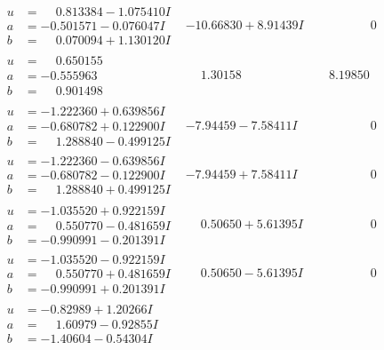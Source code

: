 \documentclass[1p]{elsarticle_modified}
\theoremstyle{definition}
\begin{document}
$$\begin{array}{c|c|c}
\begin{aligned}
u &= \phantom{-}0.813384 - 1.075410 I \\
a &= -0.501571 - 0.076047 I \\
b &= \phantom{-}0.070094 + 1.130120 I\end{aligned}
 & -10.66830 + 8.91439 I & \phantom{-0.000000 } 0 \\ \hline\begin{aligned}
u &= \phantom{-}0.650155\phantom{ +0.000000I} \\
a &= -0.555963\phantom{ +0.000000I} \\
b &= \phantom{-}0.901498\phantom{ +0.000000I}\end{aligned}
 & \phantom{-}1.30158\phantom{ +0.000000I} & \phantom{-}8.19850\phantom{ +0.000000I} \\ \hline\begin{aligned}
u &= -1.222360 + 0.639856 I \\
a &= -0.680782 + 0.122900 I \\
b &= \phantom{-}1.288840 - 0.499125 I\end{aligned}
 & -7.94459 - 7.58411 I & \phantom{-0.000000 } 0 \\ \hline\begin{aligned}
u &= -1.222360 - 0.639856 I \\
a &= -0.680782 - 0.122900 I \\
b &= \phantom{-}1.288840 + 0.499125 I\end{aligned}
 & -7.94459 + 7.58411 I & \phantom{-0.000000 } 0 \\ \hline\begin{aligned}
u &= -1.035520 + 0.922159 I \\
a &= \phantom{-}0.550770 - 0.481659 I \\
b &= -0.990991 - 0.201391 I\end{aligned}
 & \phantom{-}0.50650 + 5.61395 I & \phantom{-0.000000 } 0 \\ \hline\begin{aligned}
u &= -1.035520 - 0.922159 I \\
a &= \phantom{-}0.550770 + 0.481659 I \\
b &= -0.990991 + 0.201391 I\end{aligned}
 & \phantom{-}0.50650 - 5.61395 I & \phantom{-0.000000 } 0 \\ \hline\begin{aligned}
u &= -0.82989 + 1.20266 I \\
a &= \phantom{-}1.60979 - 0.92855 I \\
b &= -1.40604 - 0.54304 I\end{aligned}

\end{array}$$
\end{document}

